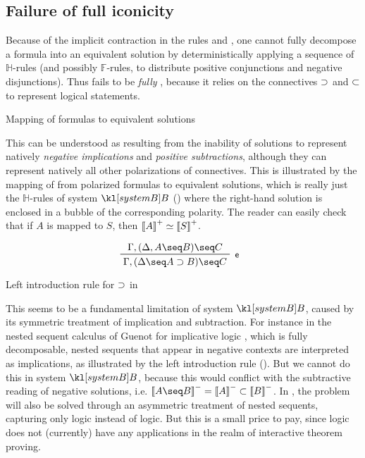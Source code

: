 \subsection{Failure of full iconicity}

Because of the implicit contraction in the rules \rsf{{\limp}{-}} and
\rsf{{\lsub}{+}}, one cannot fully decompose a formula into an equivalent
solution by deterministically applying a sequence of $\mathbb{H}$-rules (and
possibly $\mathbb{F}$-rules, to distribute positive conjunctions and negative
disjunctions). Thus  fails to be \emph{fully }, because it
relies on the \emph{} connectives $\supset$ and $\subset$ to represent
logical statements.

\begin{marginfigure}
  
  \caption{Mapping of formulas to equivalent solutions}
\end{marginfigure}

This can be understood as resulting from the inability of solutions to represent
natively \emph{negative implications} and \emph{positive subtractions}, although
they can represent natively all other polarizations of connectives. This is
illustrated by the mapping of  from polarized formulas to
equivalent solutions, which is really just the $\mathbb{H}$-rules of system
$\sysB$ () where the right-hand solution is enclosed in a
bubble of the corresponding polarity. The reader can easily check that if $A$ is
mapped to $S$, then $\left\llbracket A \right\rrbracket^+ \simeq \left\llbracket S \right\rrbracket^+$.

\begin{marginfigure}
  $$
  \R[\rsf{e}]
    {\Gamma, (\Delta, A \seq B) \seq C}
    {\Gamma, (\Delta \seq A \limp B) \seq C}
  $$
  \caption{Left introduction rule for $\supset$ in }
\end{marginfigure}

This seems to be a fundamental limitation of system $\sysB$, caused by its
symmetric treatment of implication and subtraction. For instance in the nested
sequent calculus  of Guenot for implicative logic \cite[Chapter
3]{guenot_nested_2013}, which is fully decomposable, nested sequents that appear
in negative contexts are interpreted as implications, as illustrated by the left
introduction rule  (). But we cannot do this in system
$\sysB$, because this would conflict with the subtractive reading of negative
solutions, i.e. $\nsint{A \seq B} = \nsint{A} \lsub \nsint{B}$. In
, the problem will also be solved through an asymmetric treatment
of nested sequents, capturing only  logic instead of
 logic. But this is a small price to pay, since
 logic does not (currently) have any applications in the realm
of interactive theorem proving.
